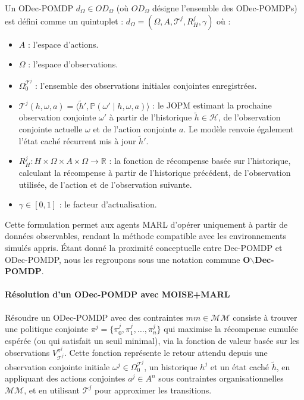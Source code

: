 Un \ac{ODec-POMDP} $d_\Omega \in OD_\Omega$ (où $OD_\Omega$ désigne l'ensemble des ODec-POMDPs) est défini comme un quintuplet :
%
$d_\Omega = \left(\Omega, A, \mathcal{T}^j, R^j_H, \gamma \right)$
%
où :
\begin{itemize}
    \item $A$ : l'espace d'actions.
    \item $\Omega$ : l'espace d'observations.
    \item $\Omega^{\mathcal{T}^j}_0$ : l'ensemble des observations initiales conjointes enregistrées.
    \item $\mathcal{T}^j(h, \omega, a) = \langle \tilde{h}', \mathbb{P}(\omega' \mid h, \omega, a) \rangle$ : le JOPM estimant la prochaine observation conjointe $\omega'$ à partir de l'historique $\tilde{h} \in \mathcal{H}$, de l'observation conjointe actuelle $\omega$ et de l'action conjointe $a$. Le modèle renvoie également l'état caché récurrent mis à jour $\tilde{h}'$.
    \item $R^j_H : H \times \Omega \times A \times \Omega \rightarrow \mathbb{R}$ : la fonction de récompense basée sur l'historique, calculant la récompense à partir de l'historique précédent, de l'observation utilisée, de l'action et de l'observation suivante.
    \item $\gamma \in [0, 1]$ : le facteur d'actualisation.
\end{itemize}

\noindent Cette formulation permet aux agents MARL d'opérer uniquement à partir de données observables, rendant la méthode compatible avec les environnements simulés appris. Étant donné la proximité conceptuelle entre Dec-POMDP et \ac{ODec-POMDP}, nous les regroupons sous une notation commune \textbf{O$\backslash$Dec-POMDP}.

\paragraph{\textbf{Résolution d'un ODec-POMDP avec MOISE+MARL}}

Résoudre un \ac{ODec-POMDP} avec des contraintes $mm \in \mathcal{MM}$ consiste à trouver une politique conjointe $\pi^j = \{\pi^j_0, \pi^j_1, \dots, \pi^j_n\}$ qui maximise la récompense cumulée espérée (ou qui satisfait un seuil minimal), via la fonction de valeur basée sur les observations $V_{\mathcal{T}^j}^{\pi^j}$. Cette fonction représente le retour attendu depuis une observation conjointe initiale $\omega^j \in \Omega^{\mathcal{T}^j}_0$, un historique $h^j$ et un état caché $\tilde{h}$, en appliquant des actions conjointes $a^j \in A^n$ sous contraintes organisationnelles $\mathcal{MM}$, et en utilisant $\mathcal{T}^j$ pour approximer les transitions.

